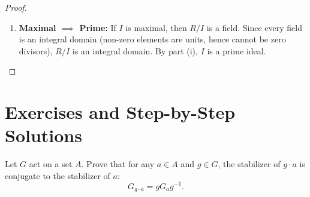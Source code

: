 \begin{proof}
\begin{enumerate}[label=\textbf{(\roman*)}, leftmargin=*, itemsep=8pt]
\begin{itemize}[leftmargin=1.5em, itemsep=4pt]
        \item \textbf{Direction $(\impliedby)$:} Suppose $R/I$ is a field.
        Let $J$ be an ideal of $R$ with $I \subsetneq J \subseteq R$.
        Choose an element $x \in J \setminus I$.
        Then $x + I \ne 0 + I$ in $R/I$.
        Since $R/I$ is a field, $x + I$ is invertible: there exists $y \in R$ such that:
        \begin{equation*}
        (x + I)(y + I) = 1 + I \implies xy + I = 1 + I \implies 1 - xy \in I \subseteq J.
        \end{equation*}
        Since $x \in J$ and $J$ is an ideal, $xy \in J$.
        Then $1 = (1 - xy) + xy \in J$.
        An ideal containing $1$ must be the whole ring: $J = R$.
        Therefore, $I$ is maximal.
    \end{itemize}

    \item \textbf{Maximal $\implies$ Prime:}
    If $I$ is maximal, then $R/I$ is a field.
    Since every field is an integral domain (non-zero elements are units, hence cannot be zero divisors), $R/I$ is an integral domain.
    By part (i), $I$ is a prime ideal.
\end{enumerate}
\end{proof}

\section{Exercises and Step-by-Step Solutions}
\label{sec:unit4_exercises}

\begin{problem}
Let $G$ act on a set $A$. Prove that for any $a \in A$ and $g \in G$, the stabilizer of $g \cdot a$ is conjugate to the stabilizer of $a$:
\begin{equation}
G_{g \cdot a} = g G_a g^{-1}.
\end{equation}
\end{problem}

